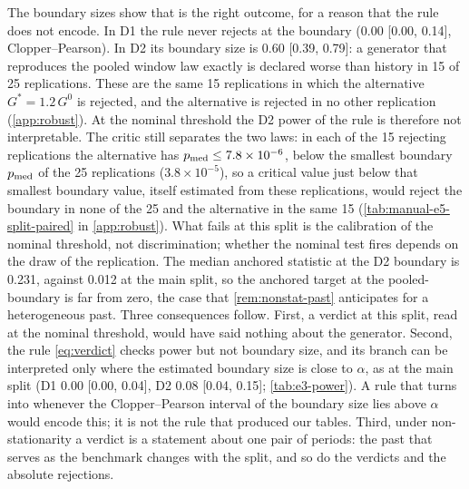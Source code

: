 The boundary sizes show that \INCONCL{} is the right outcome, for a reason that the rule does not
encode. In D1 the rule never rejects at the boundary (0.00 [0.00, 0.14], Clopper--Pearson). In D2
its boundary size is 0.60 [0.39, 0.79]: a generator that reproduces the pooled \TRAIN{} window law
exactly is declared worse than history in 15 of 25 replications. These are the same 15
replications in which the alternative $G^*=1.2\,G^0$ is rejected, and the alternative is rejected
in no other replication (\cref{app:robust}). At the nominal threshold the D2 power of the rule is
therefore not interpretable. The critic still separates the two laws: in each of the 15 rejecting
replications the alternative has $p_{\mathrm{med}}\le7.8\times10^{-6}$, below the smallest boundary $p_{\mathrm{med}}$ of
the 25 replications ($3.8\times10^{-5}$), so a critical value just below that smallest boundary
value, itself estimated from these replications, would reject the boundary in none of the 25 and
the alternative in the same 15 (\cref{tab:manual-e5-split-paired} in \cref{app:robust}). What fails at this split is the calibration of the nominal
threshold, not discrimination; whether the nominal test fires depends on the draw of the
replication. The median anchored statistic at the D2 boundary is 0.231, against 0.012 at the main
split, so the anchored target at the pooled-\TRAIN{} boundary is far from zero, the case that
\cref{rem:nonstat-past} anticipates for a heterogeneous past. Three consequences follow. First, a
\BAD{} verdict at this split, read at the nominal threshold, would have said nothing about the
generator. Second, the rule \eqref{eq:verdict} checks power but not boundary size, and
its \BAD{} branch can be interpreted only where the estimated boundary size is close to $\alpha$,
as at the main split (D1 0.00 [0.00, 0.04], D2 0.08 [0.04, 0.15]; \cref{tab:e3-power}). A rule
that turns \BAD{} into \INCONCL{} whenever the Clopper--Pearson interval of the boundary size lies
above $\alpha$ would encode this; it is not the rule that produced our tables. Third, under
non-stationarity a verdict is a statement about one pair of periods: the past that serves as the
benchmark changes with the split, and so do the verdicts and the absolute rejections.

